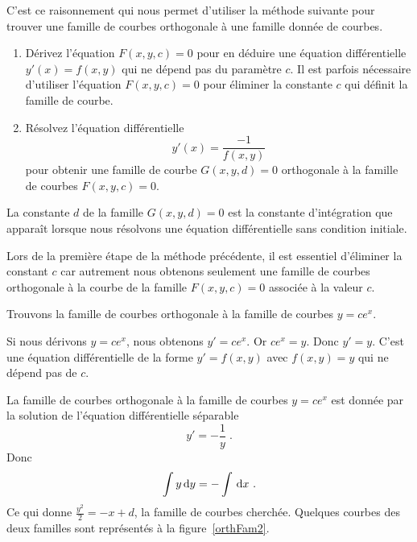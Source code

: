 {C'est ce raisonnement qui nous permet d'utiliser la méthode suivante
pour trouver une famille de courbes orthogonale à une famille donnée
de courbes.

\begin{meth}
\begin{enumerate}
\item Dérivez l'équation $F(x,y,c)=0$ pour en déduire une
équation différentielle $y'(x) = f(x,y)$ qui ne dépend pas du
paramètre $c$.  Il est parfois nécessaire d'utiliser l'équation
$F(x,y,c)=0$ pour éliminer la constante $c$ qui définit la famille de
courbe.
\item Résolvez l'équation différentielle
\begin{equation}\label{orth_fam_cond}
y'(x) = \frac{-1}{f(x,y)}
\end{equation}
pour obtenir une famille de courbe $G(x,y,d)=0$ orthogonale à la
famille de courbes $F(x,y,c)=0$.
\end{enumerate}
La constante $d$ de la famille $G(x,y,d)=0$ est la constante
d'intégration que apparaît lorsque nous résolvons une équation
différentielle sans condition initiale.
\end{meth}

Lors de la première étape de la méthode précédente, il est essentiel
d'éliminer la constant $c$ car autrement nous obtenons seulement une
famille de courbes orthogonale à la courbe de la famille
$F(x,y,c)=0$ associée à la valeur $c$.

\begin{egg}
Trouvons la famille de courbes orthogonale à la famille de courbes $y=c
e^x$.

Si nous dérivons $y=c e^x$, nous obtenons $y'= c e^x$.  Or $c e^x = y$.
Donc $y'= y$.  C'est une équation différentielle de la forme
$y'= f(x,y)$ avec $f(x,y) = y$ qui ne dépend pas de $c$.

La famille de courbes orthogonale à la famille de courbes $y=ce^x$ est
donnée par la solution de l'équation différentielle séparable
\[
y'= - \frac{1}{y} \; .
\]
Donc
\[
\int y \dx{y} = - \int \dx{x} \ .
\]
Ce qui donne $\displaystyle \frac{y^2}{2} = - x + d$, la famille de
courbes cherchée.  Quelques courbes des deux familles sont représentés
à la figure~\ref{orthFam2}.
\end{egg}


}
